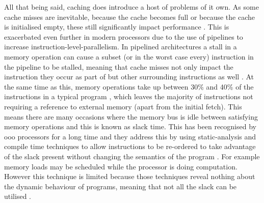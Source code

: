 
All that being said, caching does introduce a host of problems of it own. As some cache misses are inevitable, because the cache becomes full or because the cache is initialised empty, these still significantly impact performance \cite{al-zoubiPerformanceEvaluationCache2004}. This is exacerbated even further in modern processors due to the use of pipelines to increase instruction-level-parallelism. In pipelined architectures a stall in a memory operation can cause a subset (or in the worst case every) instruction in the pipeline to be stalled, meaning that cache misses not only impact the instruction they occur as part of but other surrounding instructions as well \cite{pattersonComputerOrganizationDesign2018}. At the same time as this, memory operations take up between 30\% and 40\% of the instructions in a typical program \cite{bieniaPARSECBenchmarkSuite2008, limayeWorkloadCharacterizationSPEC2018}, which leaves the majority of instructions not requiring a reference to external memory (apart from the initial fetch). This means there are many occasions where the memory bus is idle between satisfying memory operations and this is known as slack time. This has been recognised by \gls{ooo} processors for a long time and they address this by using static-analysis and compile time techniques to allow instructions to be re-ordered to take advantage of the slack present without changing the semantics of the program \cite{hennessyComputerArchitectureQuantitative2019}. For example memory loads may be scheduled while the processor is doing computation. However this technique is limited because those techniques reveal nothing about the dynamic behaviour of programs, meaning that not all the slack can be utilised \cite{whithamTimePredictableOutofOrderExecution2010}. 

